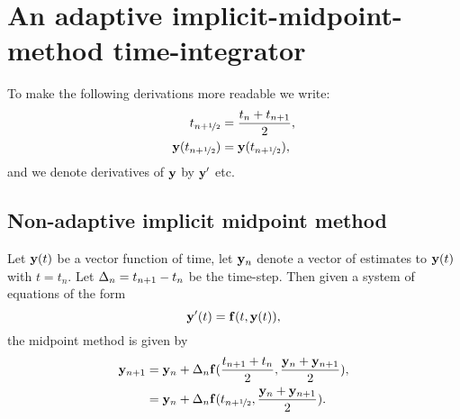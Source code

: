 


\newcommand{\thfx}[1]{t_{#1+\half}}
\newcommand{\thf}{\thfx{n}}

\newcommand{\yvhfx}[1]{\yv(\thfx{#1})}
\newcommand{\yvhf}{\yvhfx{n}}

\newcommand{\dfdy}{F}
\newcommand{\dfdyhfx}[1]{\dfdy_{#1+\half}}
\newcommand{\dfdyhf}{\dfdyhfx{n}}

\newcommand{\ymiderr}{a_n}



\section{An adaptive implicit-midpoint-method time-integrator}



To make the following derivations more readable we write:
\begin{align}
  \thf &= \frac{t_n + t_{n+1}}{2}, \notag\\
  \yvhf &= \yv(\thf), %
\end{align}
and we denote derivatives of $\mathbf{y}$ by $\mathbf{y}'$ etc.


\subsection{Non-adaptive implicit midpoint method}

Let $\mathbf{y}(t)$ be a vector function of time, let $\mathbf{y}_n$ denote a vector of estimates to $\mathbf{y}(t)$ with $t = t_n$.
Let $\Delta_{n} = t_{n+1} - t_n$ be the time-step.
Then given a system of equations of the form
\begin{equation}
  \mathbf{y}'(t) = {\mathbf{f}}(t, \mathbf{y}(t)),
  \label{eq:43}
\end{equation}
the midpoint method is given by
\begin{align}
  \yv_{n+1} &= \yv_n + \dtn \fv(\frac{t_{n+1} + t_n}{2}, \frac{\yv_n + \yv_{n+1}}{2}), \notag\\
  &= \yv_n + \dtn \fv(\thf, \frac{\yv_n + \yv_{n+1}}{2}).
  \label{eq:basic-midpoint}
\end{align}

